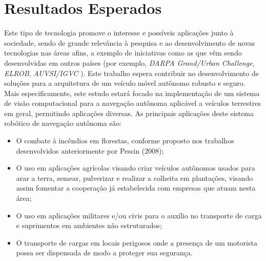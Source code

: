 
\chapter{Resultados Esperados}
\label{cap:resultados_esperados}

Este tipo de tecnologia promove o interesse e possíveis aplicações junto à sociedade, sendo de
grande relevância à pesquisa e ao desenvolvimento de novas tecnologias nas áreas afins, a exemplo
de iniciativas como as que vêm sendo desenvolvidas em outros países (por exemplo, 
\textit{DARPA Grand/Urban Challenge}, 
\textit{ELROB}, 
\textit{AUVSI/IGVC}
).
Este trabalho espera contribuir no desenvolvimento de soluções para a arquitetura de um
veículo móvel autônomo robusto e seguro. Mais especificamente, este estudo estará focado na
implementação de um sistema de visão computacional para a navegação autônoma aplicável a
veículos terrestres em geral, permitindo aplicações diversas.
As principais aplicações deste sistema robótico de navegação autônoma são:

\begin{itemize}

\item
O combate à incêndios em florestas, conforme proposto nos trabalhos desenvolvidos
anteriormente por Pessin (2008);
\item 
O uso em aplicações agrícolas visando criar veículos autônomos usados para arar a terra,
semear, pulverizar e realizar a colheita em plantações, visando assim fomentar a cooperação já
estabelecida com empresas que atuam nesta área;
\item 
O uso em aplicações militares e/ou civis para o auxílio no transporte de carga e suprimentos
em ambientes não estruturados;
\item 
O transporte de cargas em locais perigosos onde a presença de um motorista possa ser
dispensada de modo a proteger sua segurança.

\end{itemize}

%

